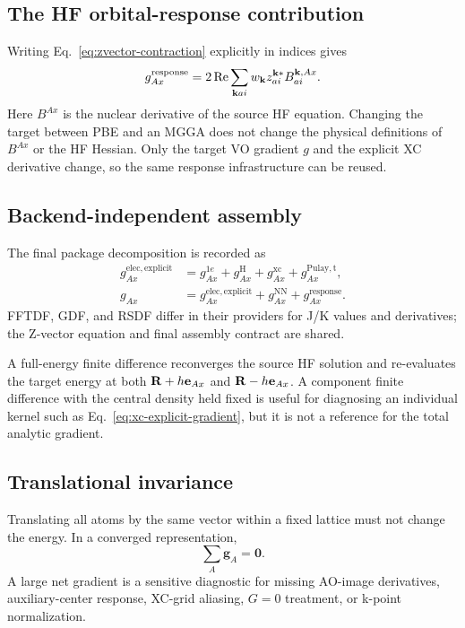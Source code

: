 \subsection{The HF orbital-response contribution}

Writing Eq.~\eqref{eq:zvector-contraction} explicitly in indices gives
\begin{equation}
  g_{Ax}^{\mathrm{response}}
  =2\operatorname{Re}\sum_{\mathbf{k} ai}w_{\mathbf{k}}
   z_{ai}^{\mathbf{k} *}B_{ai}^{\mathbf{k},Ax}.
  \label{eq:response-gradient}
\end{equation}
Here $B^{Ax}$ is the nuclear derivative of the source HF equation.  Changing
the target between PBE and an MGGA does not change the physical definitions of
$B^{Ax}$ or the HF Hessian.  Only the target VO gradient $g$ and the explicit
XC derivative change, so the same response infrastructure can be reused.

\subsection{Backend-independent assembly}

The final package decomposition is recorded as
\begin{align}
  g_{Ax}^{\mathrm{elec,explicit}}
  &=g_{Ax}^{1e}+g_{Ax}^{\mathrm H}+g_{Ax}^{\mathrm{xc}}
    +g_{Ax}^{\mathrm{Pulay,t}},\\
  g_{Ax}
  &=g_{Ax}^{\mathrm{elec,explicit}}
    +g_{Ax}^{\mathrm{NN}}+g_{Ax}^{\mathrm{response}}.
  \label{eq:final-gradient-assembly}
\end{align}
FFTDF, GDF, and RSDF differ in their providers for J/K values and derivatives;
the Z-vector equation and final assembly contract are shared.

\begin{remark}
A full-energy finite difference reconverges the source HF solution and
re-evaluates the target energy at both $\mathbf{R}+h\mathbf e_{Ax}$ and
$\mathbf{R}-h\mathbf e_{Ax}$.  A component finite difference with the central density
held fixed is useful for diagnosing an individual kernel such as
Eq.~\eqref{eq:xc-explicit-gradient}, but it is not a reference for the total
analytic gradient.
\end{remark}

\subsection{Translational invariance}

Translating all atoms by the same vector within a fixed lattice must not change
the energy.  In a converged representation,
\begin{equation}
  \sum_A\mathbf g_A=\mathbf0.
  \label{eq:translation-sum-rule}
\end{equation}
A large net gradient is a sensitive diagnostic for missing AO-image
derivatives, auxiliary-center response, XC-grid aliasing, $G=0$ treatment, or
k-point normalization.
